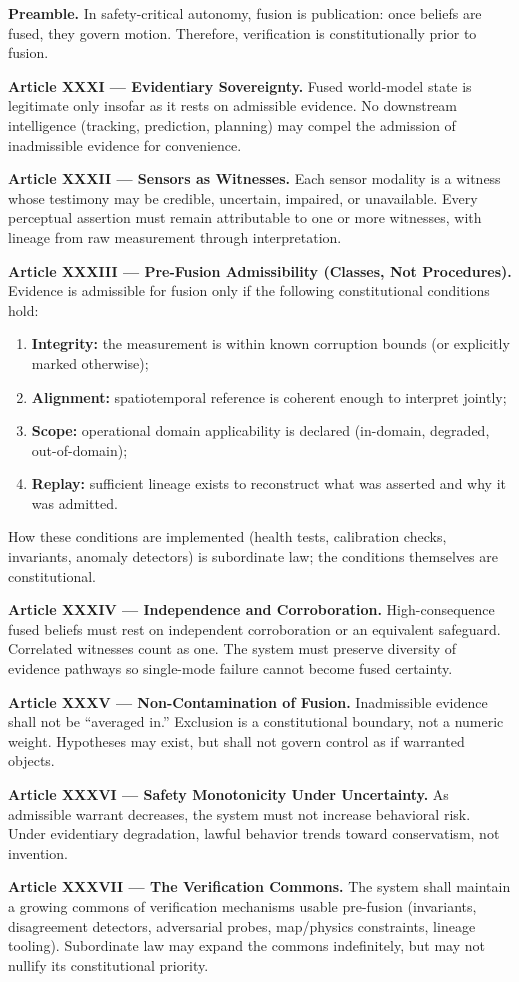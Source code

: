 \documentclass[11pt]{article}
\theoremstyle{defstyle}
\theoremstyle{mapstyle}
\begin{document}
\textbf{Preamble.}
In safety-critical autonomy, fusion is publication: once beliefs are fused, they govern motion. Therefore, verification is constitutionally prior to fusion.

\textbf{Article XXXI --- Evidentiary Sovereignty.}
Fused world-model state is legitimate only insofar as it rests on admissible evidence. No downstream intelligence (tracking, prediction, planning) may compel the admission of inadmissible evidence for convenience.

\textbf{Article XXXII --- Sensors as Witnesses.}
Each sensor modality is a witness whose testimony may be credible, uncertain, impaired, or unavailable. Every perceptual assertion must remain attributable to one or more witnesses, with lineage from raw measurement through interpretation.

\textbf{Article XXXIII --- Pre-Fusion Admissibility (Classes, Not Procedures).}
Evidence is admissible for fusion only if the following constitutional conditions hold:
\begin{enumerate}
  \item \textbf{Integrity:} the measurement is within known corruption bounds (or explicitly marked otherwise);
  \item \textbf{Alignment:} spatiotemporal reference is coherent enough to interpret jointly;
  \item \textbf{Scope:} operational domain applicability is declared (in-domain, degraded, out-of-domain);
  \item \textbf{Replay:} sufficient lineage exists to reconstruct what was asserted and why it was admitted.
\end{enumerate}
How these conditions are implemented (health tests, calibration checks, invariants, anomaly detectors) is subordinate law; the conditions themselves are constitutional.

\textbf{Article XXXIV --- Independence and Corroboration.}
High-consequence fused beliefs must rest on independent corroboration or an equivalent safeguard. Correlated witnesses count as one. The system must preserve diversity of evidence pathways so single-mode failure cannot become fused certainty.

\textbf{Article XXXV --- Non-Contamination of Fusion.}
Inadmissible evidence shall not be ``averaged in.'' Exclusion is a constitutional boundary, not a numeric weight. Hypotheses may exist, but shall not govern control as if warranted objects.

\textbf{Article XXXVI --- Safety Monotonicity Under Uncertainty.}
As admissible warrant decreases, the system must not increase behavioral risk. Under evidentiary degradation, lawful behavior trends toward conservatism, not invention.

\textbf{Article XXXVII --- The Verification Commons.}
The system shall maintain a growing commons of verification mechanisms usable pre-fusion (invariants, disagreement detectors, adversarial probes, map/physics constraints, lineage tooling). Subordinate law may expand the commons indefinitely, but may not nullify its constitutional priority.
\end{document}
